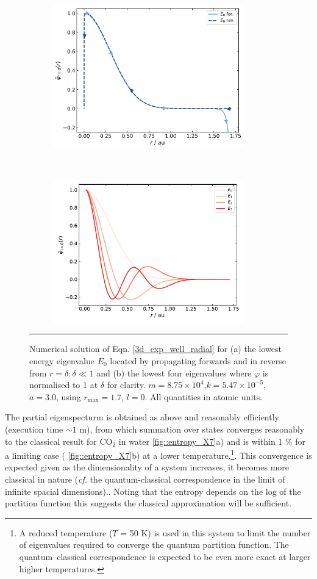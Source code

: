 \documentclass[../main.tex]{subfiles}
\begin{document}
\begin{figure}[h!]
	\begin{subfigure}[t]{0.5\textwidth}
		\centering
		\includegraphics[height=6.2cm]{4/figs/figX6/first_eigenfunction_lines.png}
		\caption{}
	\end{subfigure}%
	~ 
	\begin{subfigure}[t]{0.5\textwidth}
		\centering
		\includegraphics[height=6.2cm]{4/figs/figX6/eigenfunctions.pdf}
		\caption{}
	\end{subfigure}
	\vspace{0.2cm}
	\hrule
	\caption{Numerical solution of Eqn. \eqref{3d_exp_well_radial} for (a) the lowest energy eigenvalue $E_0$ located by propagating forwards and in reverse from $r = \delta : \delta \ll 1$ and (b) the lowest four eigenvalues where $\varphi$ is normalised to 1 at $\delta$ for clarity. $m =8.75 \times 10^4$,$k = 5.47 \times 10^{-5}$, $a = 3.0$, using $r_\text{max} = 1.7$, $l = 0$. All quantities in atomic units.} 
	\label{fig::entropy_X6}
\end{figure}

The partial eigenspecturm is obtained as above and reasonably efficiently (execution time $\sim1$ m), from which summation over states converges reasonably to the classical result for CO$_2$ in water \figurename{ \ref{fig::entropy_X7}a}) and is within 1 \% for a limiting case (\figurename{ \ref{fig::entropy_X7}b}) at a lower temperature.\footnote{A reduced temperature ($T$ = 50 K) is used in this system to limit the number of  eigenvalues required to converge the quantum partition function. The quantum--classical correspondence is expected to be even more exact at larger higher temperatures.}. This convergence is expected given as the dimensionality of a system increases, it becomes more classical in nature (\emph{cf.} the quantum-classical correspondence in the limit of infinite spacial dimensions).\cite{QuantClassCorrespondence}. Noting that the entropy depends on the log of the partition function this suggests the classical approximation will be sufficient.
\end{document}
